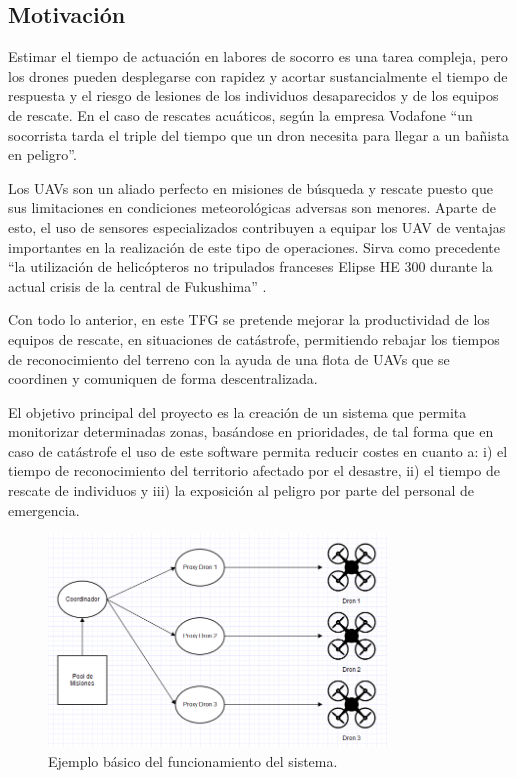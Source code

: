 \documentclass{pre-tfg}
\begin{document}
\subsection{Motivación}

Estimar el tiempo de actuación en labores de socorro es una tarea compleja, pero los drones pueden desplegarse con rapidez y acortar sustancialmente el tiempo de respuesta y el riesgo de lesiones de los individuos desaparecidos y de los equipos de rescate. En el caso de rescates acuáticos, según la empresa Vodafone \cite{tiempomenor} ``un socorrista tarda el triple del tiempo que un dron necesita para llegar a un bañista en peligro''.

Los UAVs son un aliado perfecto en misiones de búsqueda y rescate puesto que sus limitaciones en condiciones meteorológicas adversas son menores. Aparte de esto, el uso de sensores especializados contribuyen a equipar los UAV de ventajas importantes en la realización de este tipo de operaciones. Sirva como precedente ``la utilización de helicópteros no tripulados franceses Elipse HE 300 durante la actual crisis de la central de Fukushima'' \cite{notripulados}.

Con todo lo anterior, en este TFG se pretende mejorar la productividad de los equipos de rescate, en situaciones de catástrofe, permitiendo rebajar los tiempos de reconocimiento del terreno con la ayuda de una flota de UAVs que se coordinen y comuniquen de forma descentralizada.

El objetivo principal del proyecto es la creación de un sistema que permita monitorizar determinadas zonas, basándose en prioridades, de tal forma que en caso de catástrofe el uso de este software permita reducir costes en cuanto a: i) el tiempo de reconocimiento del territorio afectado por el desastre, ii) el tiempo de rescate de individuos y iii) la exposición al peligro por parte del personal de emergencia.

\begin{figure}[htb]
\centering
\includegraphics[width=0.8\textwidth]{./figures/dron.png}
\caption{Ejemplo básico del funcionamiento del sistema.}
\end{figure} 
\end{document}
